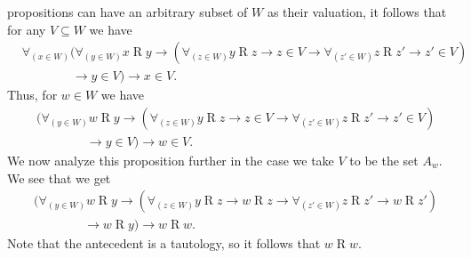 \documentclass{article}
\begin{document}
\begin{ex}
\begin{enumerate}
propositions can have an arbitrary subset of $W$ as their valuation, it follows
that for any $V\subseteq W$ we have
\begin{align*}
& \forall_{(x\in W)}
  (\forall_{(y\in W)} x\mathbin{R}y
  \to (\forall_{(z\in W)} y\mathbin{R}z\to z\in V\to\forall_{(z'\in W)} z\mathbin{R} z'\to z'\in V)
  \\
  & \qquad\qquad \to y\in V) \to x\in V.
\end{align*}
Thus, for $w\in W$ we have
\begin{align*}
& (\forall_{(y\in W)} w\mathbin{R}y
  \to (\forall_{(z\in W)} y\mathbin{R}z\to z\in V\to\forall_{(z'\in W)} z\mathbin{R} z'\to z'\in V)
  \\
  & \qquad\qquad \to y\in V) \to w\in V.
\end{align*}
We now analyze this proposition further in the case we take $V$ to be the
set $A_w$. We see that we get
\begin{align*}
& (\forall_{(y\in W)} w\mathbin{R}y
  \to (\forall_{(z\in W)} y\mathbin{R}z\to w\mathbin{R}z\to\forall_{(z'\in W)} z\mathbin{R} z'\to w\mathbin{R} z')
  \\
  & \qquad\qquad \to w\mathbin{R}y) \to w\mathbin{R} w.
\end{align*}
Note that the antecedent is a tautology, so it follows that $w\mathbin{R} w$.
\end{enumerate}
\end{ex}
\end{document}
